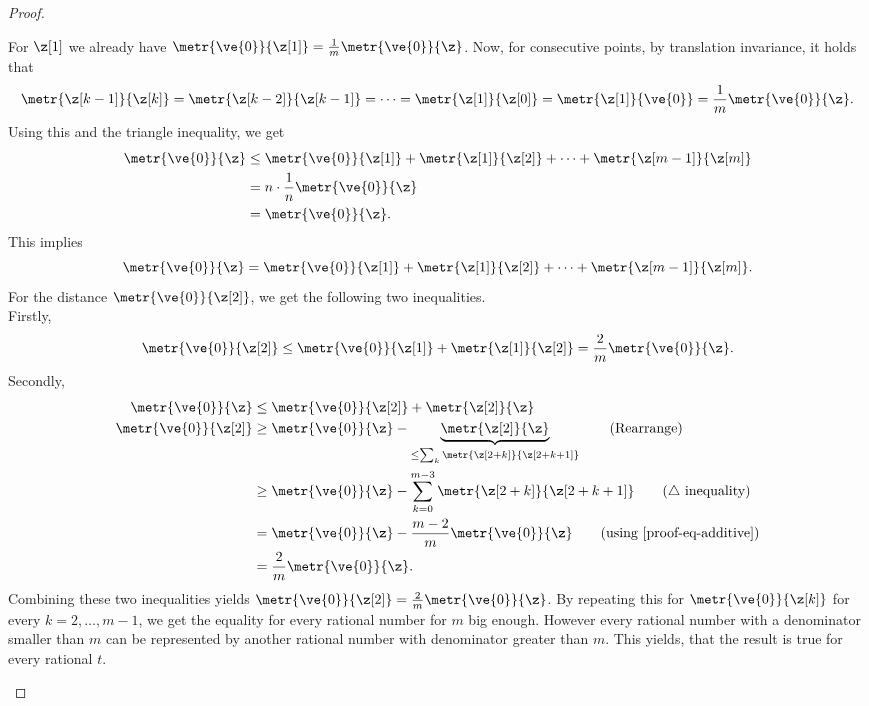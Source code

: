 \begin{proof}
	\begin{proofpart}[$t \metro{\z} = \metro{t \z}$ for $t = \frac{k}{m}$ and $k \in \{0, \dots, m\}$] \label{lemma-part3}
    For $\z[1]$ we already have $\metr{\ve{0}}{\z[1]} = \frac{1}{m} \metr{\ve{0}}{\z}$.
		Now, for consecutive points, by translation invariance, it holds that
		$$\metr{\z[k-1]}{\z[k]} = \metr{\z[k-2]}{\z[k-1]} = \dots = \metr{\z[1]}{\z[0]} = \metr{\z[1]}{\ve{0}} = \frac{1}{m} \metr{\ve{0}}{\z}.$$
		Using this and the triangle inequality, we get
		\begin{align*}
      \metr{\ve{0}}{\z}          & \leq \metr{\ve{0}}{\z[1]} + \metr{\z[1]}{\z[2]} + \dots + \metr{\z[m-1]}{\z[m]} \\
                                 & = n \cdot \frac{1}{n} \metr{\ve{0}}{\z}                                          \\
                                 & = \metr{\ve{0}}{\z}.                                                            
		\end{align*}
    This implies
    \begin{equation} \label{proof-eq-additive}
      \metr{\ve{0}}{\z} = \metr{\ve{0}}{\z[1]} + \metr{\z[1]}{\z[2]} + \dots + \metr{\z[m-1]}{\z[m]}.
    \end{equation}
    For the distance $\metr{\ve{0}}{\z[2]}$, we get the following two inequalities.\\
    Firstly,
    \begin{equation*}
      \metr{\ve{0}}{\z[2]} \leq \metr{\ve{0}}{\z[1]} + \metr{\z[1]}{\z[2]} = \frac{2}{m} \metr{\ve{0}}{\z}.
    \end{equation*}
    Secondly,
		\begin{align}
      \metr{\ve{0}}{\z}     & \leq \metr{\ve{0}}{\z[2]} + \metr{\z[2]}{\z}              \notag                                      \\
      \metr{\ve{0}}{\z[2]} & \geq \metr{\ve{0}}{\z} - \underbrace{\metr{\z[2]}{\z}}_{\leq \sum_k \metr{\z[2+k]}{\z[2+k+1]}} \tag{Rearrange} \\
                           & \geq \metr{\ve{0}}{\z} - \sum_{k=0}^{m-3} \metr{\z[2+k]}{\z[2+k+1]}             \tag{$\triangle$ inequality}              \\
                           & = \metr{\ve{0}}{\z} - \frac{m-2}{m} \metr{\ve{0}}{\z}                         \tag{using \cref{proof-eq-additive}}                     \\
                               & = \frac{2}{m} \metr{\ve{0}}{\z}. \notag
		\end{align}
    Combining these two inequalities yields $\metr{\ve{0}}{\z[2]} = \frac{2}{m} \metr{\ve{0}}{\z}$.
    By repeating this for $\metr{\ve{0}}{\z[k]}$ for every $k = 2, \dots, m-1$, we get the equality for every rational number for $m$ big enough. However every rational number with a denominator smaller than $m$ can be represented by another rational number with denominator greater than $m$. This yields, that the result is true for every rational $t$.
	\end{proofpart}



\end{proof}
